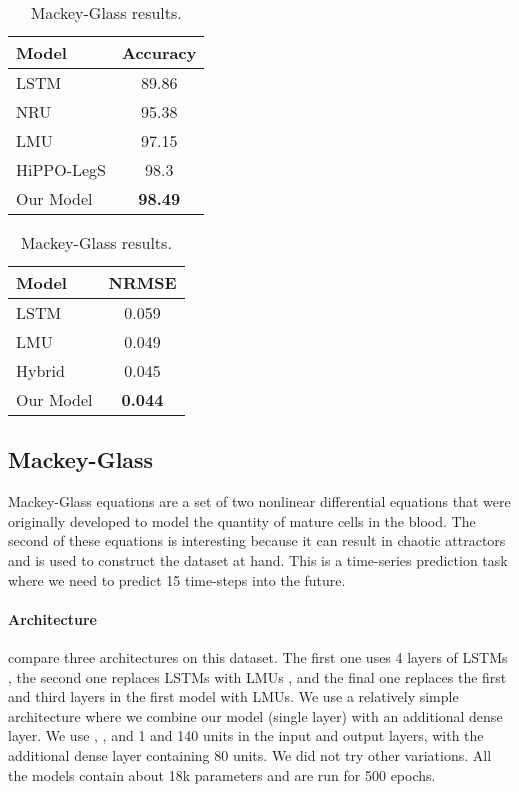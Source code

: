 \documentclass{article}
\begin{document}
\begin{table}
\parbox{.45\linewidth}{
\centering
\caption{ psMNIST results. The first three rows are from  \citet{voelker2019legendre}, and the fourth row is from \citet{gu2020hippo}.}
\label{table_psmnist_score}
\begin{tabular}{lc}
\hline\noalign{\smallskip}
Model & Accuracy\\
\hline\noalign{\smallskip}
LSTM & 89.86\\
NRU & 95.38\\
LMU & 97.15\\
HiPPO-LegS & 98.3\\
Our Model &  {\bf 98.49}  \\
\hline
\end{tabular}

}
\hfill
\parbox{.45\linewidth}{
\centering
\caption{Mackey-Glass results.}
\label{table: mackey-glass}
\begin{tabular}{lc}
\hline\noalign{\smallskip}
Model & NRMSE  \\
\hline\noalign{\smallskip}
LSTM        &  0.059       \\
LMU         &  0.049      \\
Hybrid      &  0.045        \\
Our Model   &  {\bf 0.044} \\
\hline
\end{tabular}

}
\end{table}


\subsection{Mackey-Glass}
Mackey-Glass equations are a set of two nonlinear differential equations that were originally developed to model the quantity of mature cells in the blood. The second of these equations is interesting because it can result in chaotic attractors and is used to construct the dataset at hand. This is a time-series prediction task where we need to predict 15 time-steps into the future.

\paragraph{Architecture} \citet{voelker2018improving} compare three architectures on this dataset. The first one uses 4 layers of LSTMs , the second one replaces LSTMs with LMUs , and the final one replaces the first and third layers in the first model with LMUs. We use a relatively simple architecture where we combine our model (single layer) with an additional dense layer. We use , , and 1 and 140 units in the input and output layers, with the additional dense layer containing 80 units. We did not try other variations. All the models contain about 18k parameters and are run for 500 epochs.
\end{document}
